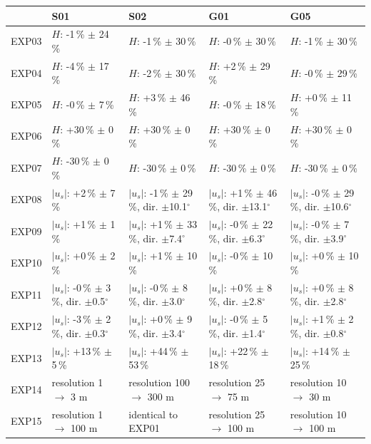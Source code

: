 \begin{tabular}{lllll}
\toprule
 & S01 & S02 & G01 & G05 \\
\midrule
EXP03 & $H$: -1\,\% $\pm$ 24\,\% & $H$: -1\,\% $\pm$ 30\,\% & $H$: -0\,\% $\pm$ 30\,\% & $H$: -1\,\% $\pm$ 30\,\% \\
EXP04 & $H$: -4\,\% $\pm$ 17\,\% & $H$: -2\,\% $\pm$ 30\,\% & $H$: +2\,\% $\pm$ 29\,\% & $H$: -0\,\% $\pm$ 29\,\% \\
EXP05 & $H$: -0\,\% $\pm$ 7\,\% & $H$: +3\,\% $\pm$ 46\,\% & $H$: -0\,\% $\pm$ 18\,\% & $H$: +0\,\% $\pm$ 11\,\% \\
EXP06 & $H$: +30\,\% $\pm$ 0\,\% & $H$: +30\,\% $\pm$ 0\,\% & $H$: +30\,\% $\pm$ 0\,\% & $H$: +30\,\% $\pm$ 0\,\% \\
EXP07 & $H$: -30\,\% $\pm$ 0\,\% & $H$: -30\,\% $\pm$ 0\,\% & $H$: -30\,\% $\pm$ 0\,\% & $H$: -30\,\% $\pm$ 0\,\% \\
EXP08 & $|u_s|$: +2\,\% $\pm$ 7\,\% & $|u_s|$: -1\,\% $\pm$ 29\,\%, dir. $\pm$10.1$^\circ$ & $|u_s|$: +1\,\% $\pm$ 46\,\%, dir. $\pm$13.1$^\circ$ & $|u_s|$: -0\,\% $\pm$ 29\,\%, dir. $\pm$10.6$^\circ$ \\
EXP09 & $|u_s|$: +1\,\% $\pm$ 1\,\% & $|u_s|$: +1\,\% $\pm$ 33\,\%, dir. $\pm$7.4$^\circ$ & $|u_s|$: -0\,\% $\pm$ 22\,\%, dir. $\pm$6.3$^\circ$ & $|u_s|$: -0\,\% $\pm$ 7\,\%, dir. $\pm$3.9$^\circ$ \\
EXP10 & $|u_s|$: +0\,\% $\pm$ 2\,\% & $|u_s|$: +1\,\% $\pm$ 10\,\% & $|u_s|$: -0\,\% $\pm$ 10\,\% & $|u_s|$: +0\,\% $\pm$ 10\,\% \\
EXP11 & $|u_s|$: -0\,\% $\pm$ 3\,\%, dir. $\pm$0.5$^\circ$ & $|u_s|$: -0\,\% $\pm$ 8\,\%, dir. $\pm$3.0$^\circ$ & $|u_s|$: +0\,\% $\pm$ 8\,\%, dir. $\pm$2.8$^\circ$ & $|u_s|$: +0\,\% $\pm$ 8\,\%, dir. $\pm$2.8$^\circ$ \\
EXP12 & $|u_s|$: -3\,\% $\pm$ 2\,\%, dir. $\pm$0.3$^\circ$ & $|u_s|$: +0\,\% $\pm$ 9\,\%, dir. $\pm$3.4$^\circ$ & $|u_s|$: -0\,\% $\pm$ 5\,\%, dir. $\pm$1.4$^\circ$ & $|u_s|$: +1\,\% $\pm$ 2\,\%, dir. $\pm$0.8$^\circ$ \\
EXP13 & $|u_s|$: +13\,\% $\pm$ 5\,\% & $|u_s|$: +44\,\% $\pm$ 53\,\% & $|u_s|$: +22\,\% $\pm$ 18\,\% & $|u_s|$: +14\,\% $\pm$ 25\,\% \\
EXP14 & resolution 1 $\rightarrow$ 3 m & resolution 100 $\rightarrow$ 300 m & resolution 25 $\rightarrow$ 75 m & resolution 10 $\rightarrow$ 30 m \\
EXP15 & resolution 1 $\rightarrow$ 100 m & identical to EXP01 & resolution 25 $\rightarrow$ 100 m & resolution 10 $\rightarrow$ 100 m \\
\bottomrule
\end{tabular}
